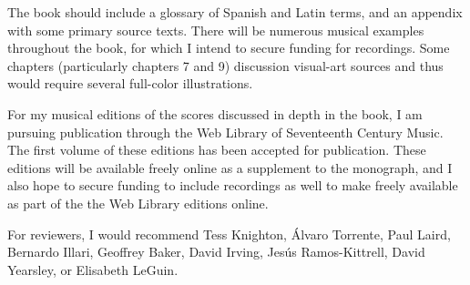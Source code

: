 \documentclass{vcbook-proposal}
\begin{document}
The book should include a glossary of Spanish and Latin terms, and an appendix 
with some primary source texts.
There will be numerous musical examples throughout the book, for which I intend 
to secure funding for recordings.
Some chapters (particularly chapters 7 and 9) discussion visual-art sources and 
thus would require several full-color illustrations.

For my musical editions of the scores discussed in depth in the book, I am 
pursuing publication through the Web Library of Seventeenth Century Music.
The first volume of these editions has been accepted for publication.
These editions will be available freely online as a supplement to the 
monograph, and I also hope to secure funding to include recordings as well to 
make freely available as part of the the Web Library editions online.

For reviewers, I would recommend Tess Knighton, Álvaro Torrente, Paul Laird, 
Bernardo Illari, Geoffrey Baker, David Irving, Jesús Ramos-Kittrell, David
Yearsley, or Elisabeth LeGuin.
\end{document}
